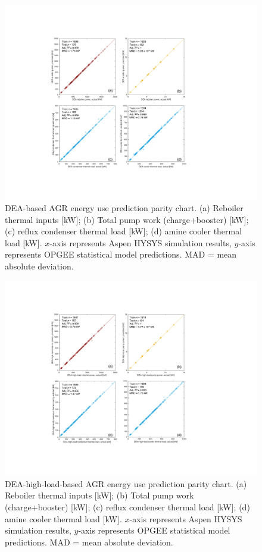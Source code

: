 \documentclass[11pt]{report}
\begin{document}
\begin{figure}
\includegraphics[width=1\columnwidth]{images/DEA_comb.pdf}
\caption{DEA-based AGR energy use prediction parity chart. (a) Reboiler thermal inputs [kW]; (b) Total pump work (charge+booster) [kW]; (c) reflux condenser thermal load [kW]; (d) amine cooler thermal load [kW]. $x$-axis represents Aspen HYSYS simulation results, $y$-axis represents OPGEE statistical model predictions. MAD = mean absolute deviation.}
\label{fig:AGR_resid_DEA}
\end{figure}

\begin{figure}
\includegraphics[width=1\columnwidth]{images/DEA_high_comb.pdf}
\caption{DEA-high-load-based AGR energy use prediction parity chart. (a) Reboiler thermal inputs [kW]; (b) Total pump work (charge+booster) [kW]; (c) reflux condenser thermal load [kW]; (d) amine cooler thermal load [kW]. $x$-axis represents Aspen HYSYS simulation results, $y$-axis represents OPGEE statistical model predictions. MAD = mean absolute deviation.}
\label{fig:AGR_resid_DEA-HL}
\end{figure}
\end{document}
